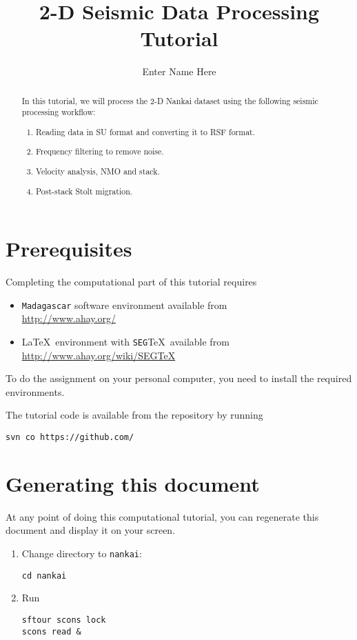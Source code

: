 \author{Enter Name Here}
\title{2-D Seismic Data Processing Tutorial}

\begin{abstract}
  In this tutorial, we will process the 2-D Nankai dataset using the following seismic processing workflow:
  \begin{enumerate}
  \item Reading data in SU format and converting it to RSF format. 
  \item Frequency filtering to remove noise.
  \item Velocity analysis, NMO and stack.
  \item Post-stack Stolt migration.
  \end{enumerate}
\end{abstract}

\section{Prerequisites}

Completing the computational part of this tutorial requires
\begin{itemize}
\item \texttt{Madagascar} software environment available from \\
\url{http://www.ahay.org/}
\item \LaTeX\ environment with \texttt{SEG}\TeX\ available from \\ 
\url{http://www.ahay.org/wiki/SEGTeX}
\end{itemize}
To do the assignment on your personal computer, you need to install
the required environments. 

The tutorial code is available from the repository
by running
\begin{verbatim}
svn co https://github.com/
\end{verbatim}

\section{Generating this document}

At any point of doing this computational tutorial, you can
regenerate this document and display it on your screen.

\begin{enumerate}          
\item Change directory to \texttt{nankai}:
\begin{verbatim}
cd nankai
\end{verbatim}
\item Run
\begin{verbatim}
sftour scons lock
scons read &
\end{verbatim}
\end{enumerate}

